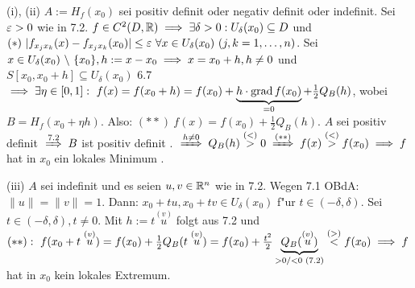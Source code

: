 \documentclass[a4paper,twoside,DIV15,BCOR12mm,chapterprefix=true,headings=twolinechapter]{scrbook}
\begin{document}
\begin{beweis}
\begin{liste}
\item[(i),]
(ii) $A:=H_f(x_0)$ sei positiv definit oder negativ definit oder indefinit. Sei $\varepsilon>0$ wie in 7.2. $f\in C^2(D,\mathbb{R})\implies \exists \delta>0: U_\delta(x_0)\subseteq D$ und $(*)\ |f_{x_jx_k}(x)-f_{x_jx_k}(x_0)|\le\ep\ \forall x\in U_\delta(x_0)\ (j,k=1,\ldots,n)$. Sei $x\in U_\delta(x_0) \ \backslash\ \{x_0\}, h:=x-x_0\implies x=x_0+h, h\ne 0$ und $S[x_0,x_0+h] \subseteq U_\delta(x_0)$ 6.7$\folgt\exists \eta\in [0,1]:\ f(x)=f(x_0+h)=f(x_0) + \underbrace{h\cdot \grad f(x_0)}_{=0}+\frac{1}{2}Q_B(h)$, wobei $B=H_f(x_0 + \eta h)$. Also: $(**)\ f(x)=f(x_0)+\frac{1}{2}Q_B(h)$. $A$ sei positiv definit  $\folgtnach{7.2} B$ ist positiv definit . $\folgtwegen{h\ne 0}Q_B(h)\stackrel{(<)}{>}0 \folgtwegen{(**)}f(x)\stackrel{(<)}{>}f(x_0)\folgt f$ hat in $x_0$ ein lokales Minimum .
\item[(iii)]$A$ sei indefinit und es seien $u, v\in\mathbb{R}^n$ wie in 7.2. Wegen 7.1 OBdA: $\|u\|=\|v\|=1$. Dann: $x_0+tu, x_0+tv \in U_\delta(x_0)$ f"ur $t\in(-\delta, \delta)$. Sei $t\in(-\delta, \delta), t\ne 0$. Mit $h:=t\stackrel{(v)}{u}$ folgt aus 7.2 und $(**):\ f(x_0+t\stackrel{(v)}{u})=f(x_0)+\frac{1}{2}Q_B(t\stackrel{(v)}{u})=f(x_0)+\frac{t^2}{2}\underbrace{Q_B(\stackrel{(v)}{u})}_{>0\text{/}<0\text{ (7.2)}}\stackrel{(>)}{<}f(x_0)\folgt f$ hat in $x_0$ kein lokales Extremum.
\end{liste}
\end{beweis}
\end{document}
